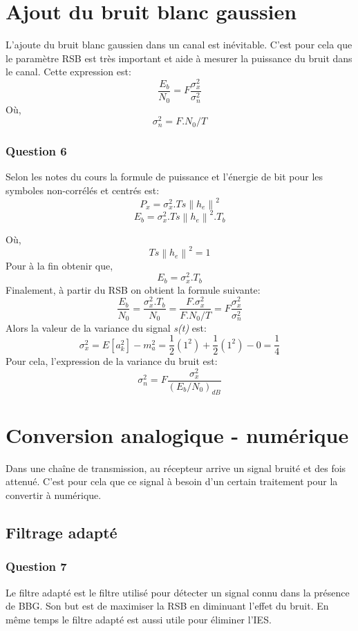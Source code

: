 \documentclass[a4paper,11pt]{article}
\begin{document}
\section{Ajout du bruit blanc gaussien}
L'ajoute du bruit blanc gaussien dans un canal est inévitable. C'est pour cela que le paramètre RSB est très important et aide à mesurer la puissance du bruit dans le canal. Cette expression est:
\[ \frac{E_b}{N_0}=F\frac{\sigma ^{2}_x}{\sigma ^{2}_n}\]
Où, \[ \sigma ^{2}_n = F.N_0/T\]
\subsubsection*{Question 6}
Selon les notes du cours la formule de puissance et l'énergie de bit pour les symboles non-corrélés et centrés est:
\[ P_x=\sigma _x ^2.Ts\left \| h_e \right \|^2 \]
\[E_b=\sigma _x ^2.Ts\left \| h_e \right \|^2.T_b\]

Où, \[Ts\left \| h_e \right \|^2 = 1\]
Pour à la fin obtenir que,
\[E_b=\sigma _x ^2.T_b \]
Finalement, à partir du RSB on obtient la formule suivante:
\[\frac{E_b}{N_0}=\frac{\sigma _x ^2.T_b}{N_0} = \frac{F.\sigma _x ^2}{F.N_0/T} = 
F\frac{\sigma ^{2}_x}{\sigma ^{2}_n}
\]
Alors la valeur de la variance du signal \emph{s(t)} est:
\[\sigma _x ^2=E[a_k^2]-m_a^2= \frac{1}{2}(1^2)+\frac{1}{2}(1^2)-0=\frac{1}{4}\]
Pour cela, l'expression de la variance du bruit est:
\[\sigma _n ^2=F\frac{\sigma _x ^2}{(E_b/N_0)_{dB}}\]
\section{Conversion analogique - numérique}
Dans une chaîne de transmission, au récepteur arrive un signal bruité et des fois attenué. C'est pour cela que ce signal à besoin d'un certain traitement pour la convertir à numérique.

\subsection{Filtrage adapté}
\subsubsection*{Question 7}
Le filtre adapté est le filtre utilisé pour détecter un signal connu dans la présence de BBG. Son but est de maximiser la RSB en diminuant l'effet du bruit. En même temps le filtre adapté est aussi utile pour éliminer l'IES.
\end{document}
